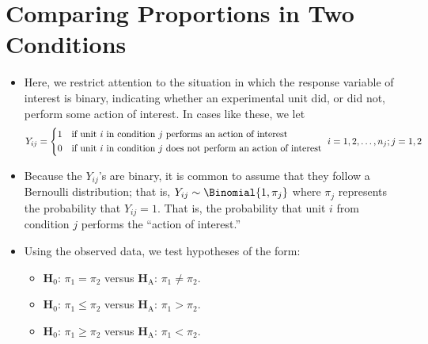 \section{Comparing Proportions in Two Conditions}
\begin{itemize}
    \item Here, we restrict attention to the situation in which the response variable of interest
          is binary, indicating whether an experimental unit did, or did not, perform
          some action of interest. In cases like these, we let
          \[ Y_{ij}=\begin{cases*}
                  1 & if unit $ i $ in condition $ j $ performs an action of interest         \\
                  0 & if unit $ i $ in condition $ j $ does not perform an action of interest
              \end{cases*}i=1,2,\ldots,n_j;j=1,2 \]
    \item Because the $ Y_{ij} $'s are binary, it is common to assume that they follow
          a Bernoulli distribution; that is, $ Y_{ij}\sim \Binomial{1,\pi_j} $ where
          $ \pi_j $ represents the probability that $ Y_{ij}=1 $. That is,
          the probability that unit $ i $ from condition $ j $ performs the ``action of interest.''
    \item Using the observed data, we test hypotheses of the form:
          \begin{itemize}
              \item $ \mathbf{H}_0 $: $ \pi_1=\pi_2 $ versus $ \mathbf{H}_\text{A} $: $ \pi_1\ne\pi_2 $.
              \item $ \mathbf{H}_0 $: $ \pi_1\le\pi_2 $ versus $ \mathbf{H}_\text{A} $: $ \pi_1>\pi_2 $.
              \item $ \mathbf{H}_0 $: $ \pi_1\ge\pi_2 $ versus $ \mathbf{H}_\text{A} $: $ \pi_1<\pi_2 $.
          \end{itemize}
\end{itemize}
